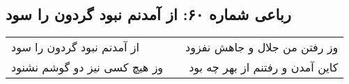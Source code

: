 \begin{center}
\section*{رباعی شماره ۶۰: از آمدنم نبود گردون را سود}
\label{sec:sh060}
\begin{longtable}{l p{0.5cm} r}
از آمدنم نبود گردون را سود
&&
وز رفتن من جلال و جاهش نفزود
\\
وز هیچ کسی نیز دو گوشم نشنود
&&
کاین آمدن و رفتنم از بهر چه بود
\\
\end{longtable}
\end{center}
